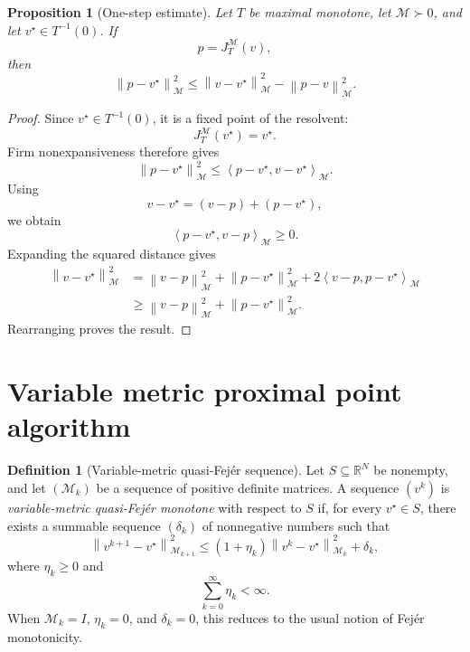\documentclass[a4paper,11pt]{book}
\theoremstyle{plain}
\newtheorem{proposition}[theorem]{Proposition}
\theoremstyle{definition}
\newtheorem{definition}[theorem]{Definition}
\theoremstyle{remark}
\numberwithin{equation}{chapter}
\numberwithin{algorithm}{chapter}
\newcommand{\R}{\mathbb{R}}
\newcommand{\norm}[1]{\left\|#1\right\|}
\newcommand{\inner}[2]{\left\langle #1, #2 \right\rangle}
\begin{document}
	\begin{proposition}[One-step estimate]
		Let \(T\) be maximal monotone, let \(\mathcal M\succ0\), and let
		\(v^\star\in T^{-1}(0)\). If
		\[
		p=J_T^{\mathcal M}(v),
		\]
		then
		\begin{equation}
			\norm{p-v^\star}_{\mathcal M}^2
			\leq
			\norm{v-v^\star}_{\mathcal M}^2
			-
			\norm{p-v}_{\mathcal M}^2.
			\label{eq:resolvent-one-step}
		\end{equation}
	\end{proposition}
	
	\begin{proof}
		Since \(v^\star\in T^{-1}(0)\), it is a fixed point of the resolvent:
		\[
		J_T^{\mathcal M}(v^\star)=v^\star.
		\]
		Firm nonexpansiveness therefore gives
		\[
		\norm{p-v^\star}_{\mathcal M}^2
		\leq
		\inner{p-v^\star}{v-v^\star}_{\mathcal M}.
		\]
		Using
		\[
		v-v^\star=(v-p)+(p-v^\star),
		\]
		we obtain
		\[
		\inner{p-v^\star}{v-p}_{\mathcal M}\geq0.
		\]
		Expanding the squared distance gives
		\begin{align}
			\norm{v-v^\star}_{\mathcal M}^2
			&=
			\norm{v-p}_{\mathcal M}^2
			+
			\norm{p-v^\star}_{\mathcal M}^2
			+
			2\inner{v-p}{p-v^\star}_{\mathcal M}\\
			&\geq
			\norm{v-p}_{\mathcal M}^2
			+
			\norm{p-v^\star}_{\mathcal M}^2.
		\end{align}
		Rearranging proves the result.
	\end{proof}
	
	\section{Variable metric proximal point algorithm}
	
	\begin{definition}[Variable-metric quasi-Fejér sequence]
		Let \(S\subseteq\R^N\) be nonempty, and let
		\((\mathcal M_k)\) be a sequence of positive definite matrices. A sequence
		\((v^k)\) is \emph{variable-metric quasi-Fejér monotone} with respect to
		\(S\) if, for every \(v^\star\in S\), there exists a summable sequence
		\((\delta_k)\) of nonnegative numbers such that
		\begin{equation}
			\norm{v^{k+1}-v^\star}_{\mathcal M_{k+1}}^2
			\leq
			(1+\eta_k)
			\norm{v^k-v^\star}_{\mathcal M_k}^2
			+
			\delta_k,
			\label{eq:variable-quasi-fejer}
		\end{equation}
		where \(\eta_k\geq0\) and
		\[
		\sum_{k=0}^{\infty}\eta_k<\infty.
		\]
		When \(\mathcal M_k=I\), \(\eta_k=0\), and \(\delta_k=0\), this reduces to
		the usual notion of Fejér monotonicity.
	\end{definition}
	
\end{document}
